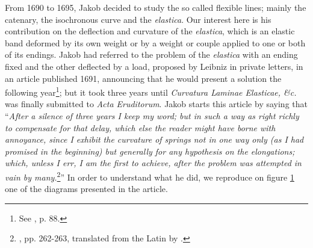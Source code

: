 From 1690 to 1695, Jakob decided to study the so called flexible lines; mainly the catenary, the isochronous curve and the \emph{elastica}. Our interest here is his contribution on the deflection and curvature of the \emph{elastica}, which is an elastic band deformed by its own weight or by a weight or couple applied to one or both of its endings. Jakob had referred to the problem of the \emph{elastica} with an ending fixed and the other deflected by a load, proposed by Leibniz in private letters, in an article published 1691, announcing that he would present a solution the following year\footnote{See \cite{truesdell_1960}, p. 88.}; but it took three years until \emph{Curvatura Laminae Elasticae, \&c.} was finally submitted to \emph{Acta Eruditorum}. Jakob starts this article by saying that ``\emph{After a silence of three years I keep my word; but in such a way as right richly to compensate for that delay, which else the reader might have borne with annoyance, since I exhibit the curvature of springs not in one way only (as I had promised in the beginning) but generally for any hypothesis on the elongations; which, unless I err, I am the first to achieve, after the problem was attempted in vain by many.}\footnote{\cite{jakob_1694}, pp. 262-263, translated from the Latin by \cite{truesdell_1960}.}'' In order to understand what he did, we reproduce on figure \ref{fg:jakob} one of the diagrams presented in the article.     
\begin{figure}[!ht]
	\centering
	\begin{center}
	\end{center}
	\label{fg:jakob}
\end{figure}
